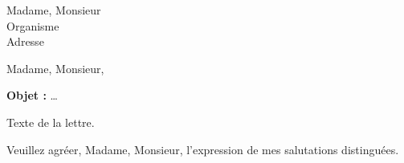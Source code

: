 \documentclass[11pt]{letter}
\begin{document}
\begin{letter}{Madame, Monsieur\\Organisme\\Adresse}
\opening{Madame, Monsieur,}
\textbf{Objet :} \dots

Texte de la lettre.

\closing{Veuillez agréer, Madame, Monsieur, l'expression de mes salutations distinguées.}
\end{letter}
\end{document}
